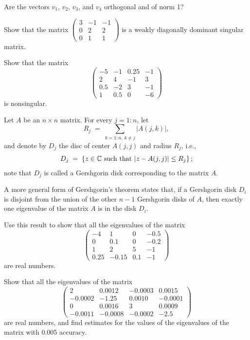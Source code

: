 \begin{exercises}
Are the vectors $v_1$, $v_2$, $v_3$, and $v_4$ orthogonal and of norm 1?

\item Show that the matrix $\begin{pmatrix} 3 & -1 & -1\\ 0 & 2 & 2\\ 0 & 1 &
1 \end{pmatrix}$ is a weakly diagonally dominant singular matrix.

\item Show that the matrix
\[
\begin{pmatrix} -5 & -1 & 0.25 & -1\\ 2 & 4 & -1 & 3\\ 0.5 & -2 & 3 & -1\\ 1 & 0.5 & 0 & -6 \end{pmatrix}
\]
is nonsingular.

\item Let $A$ be an $n \times n$ matrix. For every $j = 1:n$, let
\[
R_j \;=\; \sum_{k=1:n,\, k \neq j} |A(j,k)|,
\]
and denote by $D_j$ the disc of center $A(j,j)$ and radius $R_j$, i.e.,
\[
D_j \;=\; \left\{z \in \mathbb{C} \ \text{such that} \ |z - A(j,j)| \leq R_j\right\};
\]
note that $D_j$ is called a Gershgorin disk corresponding to the matrix $A$.

A more general form of Gershgorin's theorem states that, if a Gershgorin disk
$D_i$ is disjoint from the union of the other $n-1$ Gershgorin disks of $A$,
then exactly one eigenvalue of the matrix $A$ is in the disk $D_i$.

Use this result to show that all the eigenvalues of the matrix
\[
\begin{pmatrix} -4 & 1 & 0 & -0.5\\ 0 & 0.1 & 0 & -0.2\\ 1 & 2 & 5 & -1\\ 0.25 & -0.15 & 0.1 & -1 \end{pmatrix}
\]
are real numbers.

\item Show that all the eigenvalues of the matrix
\[
\begin{pmatrix} 2 & 0.0012 & -0.0003 & 0.0015\\ -0.0002 & -1.25 & 0.0010 & -0.0001\\ 0 & 0.0016 & 3 & 0.0009\\ -0.0011 & -0.0008 & -0.0002 & -2.5 \end{pmatrix}
\]
are real numbers, and find estimates for the values of the eigenvalues of the
matrix with 0.005 accuracy.


\end{exercises}
